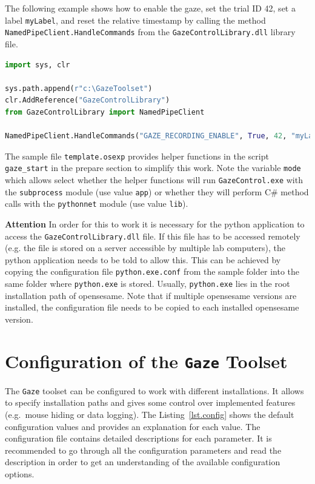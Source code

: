 \documentclass[a4paper,oneside]{book}
\begin{document}
The following example shows how to enable the gaze, set the trial ID 42, set a label \texttt{myLabel}, and reset the relative timestamp by calling the method \texttt{NamedPipeClient.HandleCommands} from the \texttt{GazeControlLibrary.dll} library file.
\begin{lstlisting}[language=Python]
import sys, clr

sys.path.append(r"c:\GazeToolset")
clr.AddReference("GazeControlLibrary")
from GazeControlLibrary import NamedPipeClient

NamedPipeClient.HandleCommands("GAZE_RECORDING_ENABLE", True, 42, "myLabel")
\end{lstlisting}

The sample file \texttt{template.osexp} provides helper functions in the script \texttt{gaze\_start} in the prepare section to simplify this work.
Note the variable \texttt{mode} which allows select whether the helper functions will run \texttt{GazeControl.exe} with the \texttt{subprocess} module (use value \texttt{app}) or whether they will perform C\# method calls with the \texttt{pythonnet} module (use value \texttt{lib}).

\begin{mdframed}[backgroundcolor=boxbkg]\textbf{\color{red}Attention}
    In order for this to work it is necessary for the python application to access the \texttt{GazeControlLibrary.dll} file.
    If this file has to be accessed remotely (e.g. the file is stored on a server accessible by multiple lab computers), the python application needs to be told to allow this.
    This can be achieved by copying the configuration file \texttt{python.exe.conf} from the sample folder into the same folder where \texttt{python.exe} is stored.
    Usually, \texttt{python.exe} lies in the root installation path of opensesame.
    Note that if multiple opensesame versions are installed, the configuration file needs to be copied to each installed opensesame version.
\end{mdframed}


\chapter{Configuration of the \texttt{Gaze} Toolset}
\label{sec.config}
The \texttt{Gaze} toolset can be configured to work with different installations.
It allows to specify installation paths and gives some control over implemented features (e.g.~mouse hiding or data logging).
The Listing~\ref{lst.config} shows the default configuration values and provides an explanation for each value.
The configuration file contains detailed descriptions for each parameter.
It is recommended to go through all the configuration parameters and read the description in order to get an understanding of the available configuration options.
\end{document}
